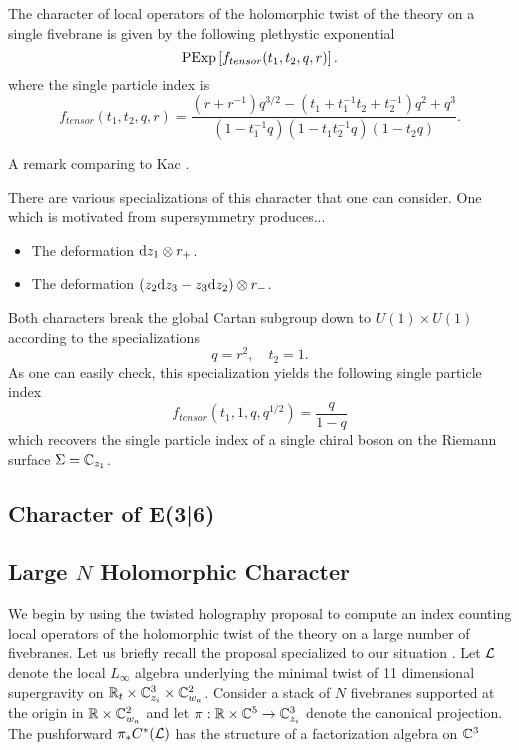 \documentclass[11pt]{amsart}
\begin{document}
\begin{prop}
The character of local operators of the holomorphic twist of the theory on a single fivebrane is given by the following plethystic exponential
\[
{\rm PExp} \left[f_{tensor} (t_1,t_2,q,r) \right] .
\]
where the single particle index is
\[
f_{tensor} (t_1,t_2,q,r) = \frac{(r + r^{-1})q^{3/2} - (t_1 + t_1^{-1} t_2 + t_2^{-1} )q^2 + q^3}{(1-t_1^{-1}q) (1-t_1 t_2^{-1} q) (1-t_2 q)} .
\]
\end{prop}

\parsec

A remark comparing to Kac \cite{KR1}. 

\parsec

There are various specializations of this character that one can consider. 
One which is motivated from supersymmetry produces...

\begin{itemize}
\item The deformation ${\rm d} z_1 \otimes r_+$.
\item The deformation $(z_2 {\rm d} z_3 - z_3 {\rm d} z_2) \otimes r_-$. 
\end{itemize}

Both characters break the global Cartan subgroup down to $U(1) \times U(1)$ according to the specializations
\[
q = r^2 , \quad t_2 = 1 .
\]
As one can easily check, this specialization yields the following single particle index
\[
f_{tensor}(t_1, 1, q, q^{1/2}) = \frac{q}{1-q} 
\]
which recovers the single particle index of a single chiral boson on the Riemann surface $\Sigma = \mathbb{C}_{z_1}$. 

\subsection{Character of E(3|6)}


\subsection{Large $N$ Holomorphic Character}

We begin by using the twisted holography proposal to compute an index counting local operators of the holomorphic twist of the theory on a large number of fivebranes. Let us briefly recall the proposal specialized to our situation . Let $\mathcal L$ denote the local $L_{\infty}$ algebra underlying the minimal twist of 11 dimensional supergravity on $\mathbb{R}_{t}\times \mathbb{C}^{3}_{z_{i}}\times \mathbb{C}^{2}_{w_{a}}$. Consider a stack of $N$ fivebranes supported at the origin in $\mathbb{R}\times \mathbb{C}^{2}_{w_{a}}$ and let $\pi : \mathbb{R}\times \mathbb{C}^{5}\to \mathbb{C}^{3}_{z_{i}}$ denote the canonical projection. The pushforward $\pi_{*} C^{*}(\mathcal L)$ has the structure of a factorization algebra on $\mathbb{C}^{3}$
\end{document}
